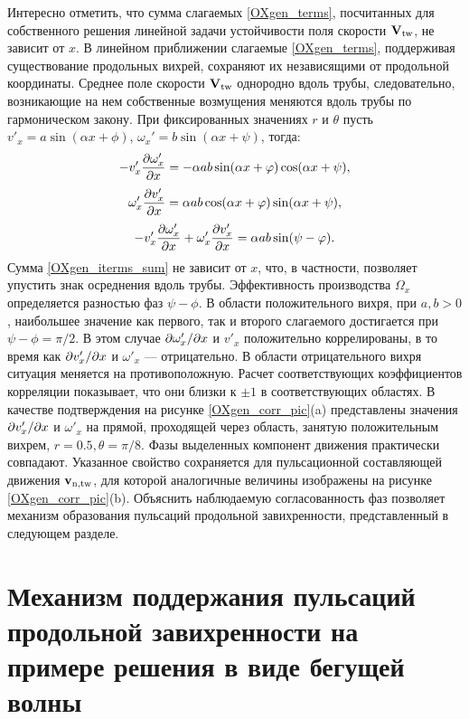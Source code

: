 Интересно отметить, что сумма слагаемых \eqref{OXgen_terms}, посчитанных для собственного решения линейной задачи устойчивости поля скорости $\mathbf{V}_\mathrm{tw}$, не зависит от $x$. В линейном приближении слагаемые \eqref{OXgen_terms}, поддерживая существование продольных вихрей, сохраняют их независящими от продольной координаты. Среднее поле скорости $\mathbf{V}_\mathrm{tw}$ однородно вдоль трубы, следовательно, возникающие на нем собственные возмущения меняются вдоль трубы по гармоническом закону. При фиксированных значениях $r$ и $\theta$ пусть  $v'_x = a \sin(\alpha x + \phi)$, $\omega_x' = b \sin(\alpha x + \psi)$, тогда:
\begin{equation*} \label{OXgen_iterms_1}
 - v'_x \frac{\partial \omega'_x}{\partial x} = - \alpha a b \sin(\alpha x + \varphi) \cos(\alpha x + \psi),
\end{equation*}
\begin{equation*} \label{OXgen_iterms_2}
\omega'_x \frac{\partial v'_x}{\partial x} =  \alpha a b \cos(\alpha x + \varphi) \sin(\alpha x + \psi),
\end{equation*}
\begin{equation} \label{OXgen_iterms_sum}
 - v'_x \frac{\partial \omega'_x}{\partial x} + \omega'_x \frac{\partial v'_x}{\partial x} = \alpha a b \sin(\psi - \varphi).
\end{equation}
Сумма \eqref{OXgen_iterms_sum} не зависит от $x$, что, в частности, позволяет упустить знак осреднения вдоль трубы. Эффективность производства  $\Omega_x$ определяется разностью фаз $\psi - \phi$. В области положительного вихря, при $a,b > 0$, наибольшее значение как первого, так и второго слагаемого достигается при $\psi - \phi = \pi/2$. В этом случае $\partial \omega'_x/\partial x$ и $v'_x$ положительно коррелированы, в то время как $\partial v'_x/\partial x$ и $\omega'_x$ --- отрицательно. В области отрицательного вихря ситуация меняется на противоположную. Расчет соответствующих коэффициентов корреляции показывает, что они близки к $\pm1$ в соответствующих областях. В качестве подтверждения на рисунке \ref{OXgen_corr_pic}(a) представлены значения $\partial v'_x/\partial x$ и $\omega'_x$ на прямой, проходящей через область, занятую положительным вихрем, $r = 0.5, \theta = \pi/8$. Фазы выделенных компонент движения практически совпадают. Указанное свойство сохраняется для пульсационной составляющей движения $\mathbf{v}_\mathrm{n,tw}$, для которой аналогичные величины изображены на рисунке \ref{OXgen_corr_pic}(b). Объяснить наблюдаемую согласованность фаз позволяет механизм образования пульсаций продольной завихренности, представленный в следующем разделе. 


\section{Механизм поддержания пульсаций продольной завихренности на примере решения в виде бегущей волны} \label{ox1gen_seq}

